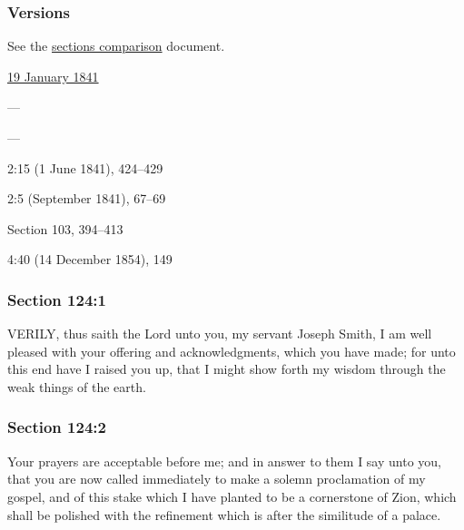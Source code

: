 	\subsubsection{Versions}
		\label{DC124-V}
		
		See the \href{https://drive.google.com/file/d/1goAvNz8jS4R8slYfMG_db55Ty2z_vmgK/view?usp=sharing}{sections comparison} document.
	
		\begin{compactdesc}
			\item[JSP] \hyperref[EMS-1841-JS-19-JAN-1841]{19 January 1841}
			\item[BC] ---
			\item[DC 1835] ---
			\item[TS] 2:15 (1 June 1841), 424--429
			\item[MS] 2:5 (September 1841), 67--69
			\item[DC 1844] Section 103, 394--413
			\item[DN] 4:40 (14 December 1854), 149
		\end{compactdesc}

	\subsubsection{Section 124:1} %
		\label{DC124-1}

		VERILY, thus saith the Lord unto you, my servant Joseph Smith, I am well pleased with your offering and acknowledgments, which you have made; for unto this end have I raised you up, that I might show forth my wisdom through the weak things of the earth.


	\subsubsection{Section 124:2} %
		\label{DC124-2}

		Your prayers are acceptable before me; and in answer to them I say unto you, that you are now called immediately to make a solemn proclamation of my gospel, and of this stake which I have planted to be a cornerstone of Zion, which shall be polished with the refinement which is after the similitude of a palace.

